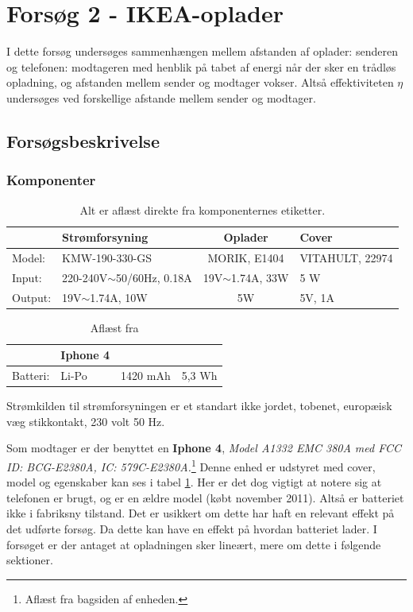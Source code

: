 \section{Forsøg 2 - IKEA-oplader}

I dette forsøg undersøges sammenhængen mellem afstanden af oplader: senderen og telefonen: modtageren med henblik på tabet af energi når der sker en trådløs opladning, og afstanden mellem sender og modtager vokser. Altså effektiviteten $\eta$ undersøges ved forskellige afstande mellem sender og modtager.

\subsection{Forsøgsbeskrivelse}
\subsubsection{Komponenter}

\begin{table}[htbp] %
\begin{tabular}{l|l|c|l}
        & Strømforsyning               & Oplader             & Cover               \\ \hline
Model:  & KMW-190-330-GS               & MORIK, E1404        & VITAHULT, 22974     \\
Input:  & 220-240V$\sim$50/60Hz, 0.18A & 19V$\sim$1.74A, 33W & 5 W       \\	
Output: & 19V$\sim$1.74A, 10W          & 5W                  & 5V, 1A             
\end{tabular}
\caption{Alt er aflæst direkte fra komponenternes etiketter.}
\label{table:sender}
\end{table}


\begin{table}[htbp]
\begin{tabular}{l|lcl}
         & Iphone 4 &          &        \\ \hline
Batteri: & Li-Po     & 1420 mAh & 5,3 Wh
\end{tabular}
\caption{Aflæst fra \cite{batteri}}
\label{table:batteri}
\end{table}

Strømkilden til strømforsyningen er et standart ikke jordet, tobenet, europæisk væg stikkontakt, 230 volt 50 Hz.

Som modtager er der benyttet en \textbf{Iphone 4}, \textit{Model A1332 EMC 380A med FCC ID: BCG-E2380A, IC: 579C-E2380A.}\footnote{Aflæst fra bagsiden af enheden.}
Denne enhed er udstyret med cover, model og egenskaber kan ses i tabel \ref{table:sender}. Her er det dog vigtigt at notere sig at telefonen er brugt, og er en ældre model (købt november 2011). Altså er batteriet ikke i fabriksny tilstand. Det er usikkert om dette har haft en relevant effekt på det udførte forsøg. Da dette kan have en effekt på hvordan batteriet lader. I forsøget er der antaget at opladningen sker lineært, mere om dette i følgende sektioner.

